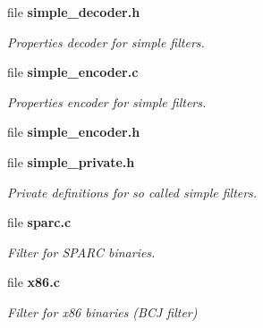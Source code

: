 \begin{DoxyCompactItemize}
file {\bf simple\-\_\-decoder.\-h}
\begin{DoxyCompactList}\small\item\em Properties decoder for simple filters. \end{DoxyCompactList}\item 
file {\bf simple\-\_\-encoder.\-c}
\begin{DoxyCompactList}\small\item\em Properties encoder for simple filters. \end{DoxyCompactList}\item 
file {\bfseries simple\-\_\-encoder.\-h}
\item 
file {\bf simple\-\_\-private.\-h}
\begin{DoxyCompactList}\small\item\em Private definitions for so called simple filters. \end{DoxyCompactList}\item 
file {\bf sparc.\-c}
\begin{DoxyCompactList}\small\item\em Filter for S\-P\-A\-R\-C binaries. \end{DoxyCompactList}\item 
file {\bf x86.\-c}
\begin{DoxyCompactList}\small\item\em Filter for x86 binaries (B\-C\-J filter) \end{DoxyCompactList}\end{DoxyCompactItemize}
